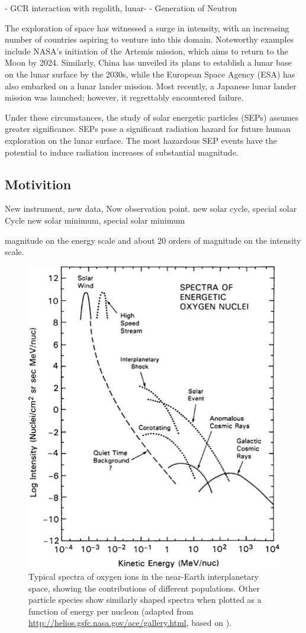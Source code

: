 - GCR interaction with regolith, lunar-
	- Generation of Neutron

The exploration of space has witnessed a surge in intensity, with an increasing number of countries aspiring to venture into this domain. Noteworthy examples include NASA's initiation of the Artemis mission, which aims to return to the Moon by 2024. Similarly, China has unveiled its plans to establish a lunar base on the lunar surface by the 2030s, while the European Space Agency (ESA) has also embarked on a lunar lander mission. Most recently, a Japanese lunar lander mission was launched; however, it regrettably encountered failure.

Under these circumstances, the study of solar energetic particles (SEPs) assumes greater significance. SEPs pose a significant radiation hazard for future human exploration on the lunar surface. The most hazardous SEP events have the potential to induce radiation increases of substantial magnitude.

\subsection{Motivition}
New instrument, new data, 
Now observation point.
new solar cycle, special solar Cycle
new solar minimum, special solar minimum





magnitude on the energy scale and about 20 orders of magnitude on the intensity scale.
\begin{figure}
    \centering
    \includegraphics[width=0.6\linewidth]{images/heliospheric_energy_spectrum}
    \caption[Spectra of oxygen ions in the near-Earth interplanetary space]{Typical spectra of oxygen ions in the near-Earth interplanetary space, showing the contributions of different populations. Other particle species show similarly shaped spectra when plotted as a function of energy per nucleon (adapted from \url{http://helios.gsfc.nasa.gov/ace/gallery.html}, based on \cite{Mewaldt-2001}).}
    \label{fig:heliospheric_energy_spectrum}
\end{figure}
